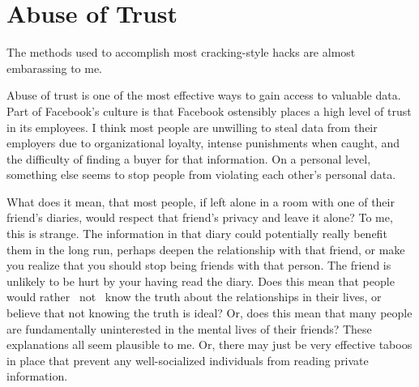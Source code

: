 \documentclass[12pt]{article}
\begin{document}
\section{Abuse of Trust}
The methods used to accomplish most cracking-style hacks are almost
embarassing to me. 

Abuse of trust is one of the most effective ways to gain access to valuable
data.  Part of Facebook's culture is that Facebook ostensibly places a high
level of trust in its employees.  I think most people are unwilling to steal
data from their employers due to organizational loyalty, intense punishments
when caught, and the difficulty of finding a buyer for that information.  On a
personal level, something else seems to stop people from violating each other's
personal data.

What does it mean, that most people, if left alone in a room with one of their
friend's diaries, would respect that friend's privacy and leave it alone?  To
me, this is strange.  The information in that diary could potentially really
benefit them in the long run, perhaps deepen the relationship with that friend,
or make you realize that you should stop being friends with that person.  The
friend is unlikely to be hurt by your having read the diary.  Does this mean
that people would rather ~not~ know the truth about the relationships in their
lives, or believe that not knowing the truth is ideal?  Or, does this mean that
many people are fundamentally uninterested in the mental lives of their friends?
These explanations all seem plausible to me.  Or, there may just be very
effective taboos in place that prevent any well-socialized individuals from
reading private information.
\end{document}
